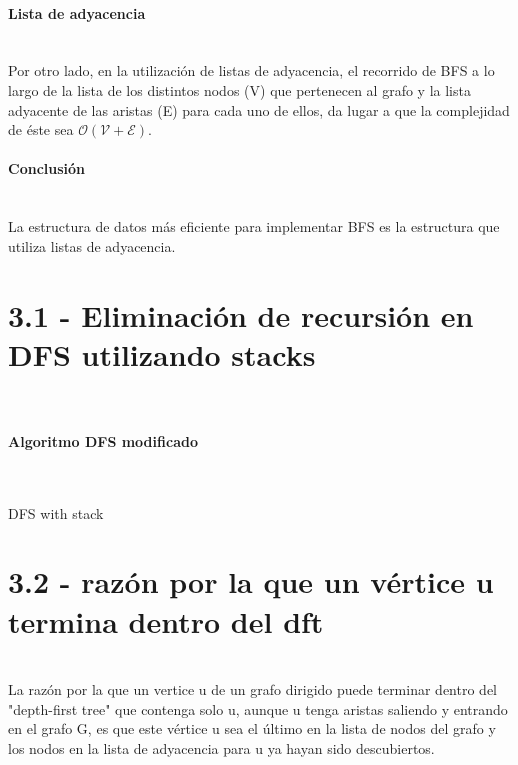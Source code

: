 \documentclass[10pt, letter]{report}
\begin{document}
\paragraph{Lista de adyacencia}~\\
Por otro lado, en la utilización de listas de adyacencia, el recorrido de BFS a lo largo de la lista de los distintos nodos (V) que pertenecen al grafo y la lista adyacente de las aristas (E) para cada uno de ellos, da lugar a que la complejidad de éste sea $\mathcal{O(V + E)}$.

\paragraph{Conclusión}~\\
La estructura de datos más eficiente para implementar BFS es la estructura que utiliza listas de adyacencia.

\section*{3.1 - Eliminación de recursión en DFS utilizando stacks}~\\

\paragraph{Algoritmo DFS modificado} \hspace{0pt} \\ %

\begin{algorithm}[H]
	\caption{DFS with stack}
	\begin{algorithmic}[1]
		\EndFor
					\EndIf
				\EndFor
			\EndIf
		\EndFor
		\EndWhile
		\EndProcedure
	\end{algorithmic}
\end{algorithm}
\section*{3.2 - razón por la que un vértice u termina dentro del dft}
\paragraph{} ~\\
La razón por la que un vertice u de un grafo dirigido puede terminar dentro del "depth-first tree" que contenga solo u, aunque u tenga aristas saliendo y entrando en el grafo G, es que este vértice u sea el último en la lista de nodos del grafo y los nodos en la lista de adyacencia para u ya hayan sido descubiertos. 
\end{document}
